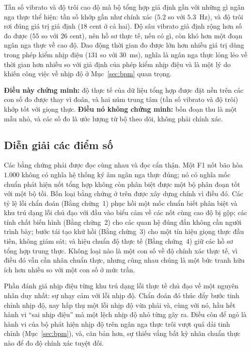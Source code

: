 \documentclass[12pt,a4paper]{article}
\begin{document}
Tần số vibrato và độ trôi cao độ mà bộ tổng hợp giả định gần với những gì ngân nga
thực thể hiện: tần số khớp gần như chính xác ($5.2$ so với $5.3$~Hz), và độ trôi rơi
đúng giá trị giả định ($18$ cent ở cả hai). Độ sâu vibrato giả định rộng hơn số đo
được ($55$ so với $26$ cent), nên hồ sơ thực tế, nếu có gì, còn khó hơn một đoạn
ngân nga thực về cao độ. Dao động thời gian đo được lớn hơn nhiều giá trị dùng trong
phép kiểm nhịp điệu ($131$ so với $30$~ms), nghĩa là ngân nga thực lỏng lẻo về thời
gian hơn nhiều so với giả định của phép kiểm nhịp điệu và là một lý do khiến công
việc về nhịp độ ở Mục~\ref{sec:bpm} quan trọng.

\textbf{Điều này chứng minh:} độ thực tế của dữ liệu tổng hợp được đặt nền trên các
con số đo được thay vì đoán, và hai núm trung tâm (tần số vibrato và độ trôi) khớp
tốt với giọng thực. \textbf{Điều nó không chứng minh:} bốn đoạn thu là một mẫu nhỏ,
và các số đo là ước lượng từ bộ theo dõi, không phải chính xác.

\subsection{Diễn giải các điểm số}
\label{sec:interpret}

Các bằng chứng phải được đọc cùng nhau và đọc cẩn thận. Một F1 nốt bão hòa $1.000$
không có nghĩa hệ thống ký âm ngân nga thực đúng; nó có nghĩa mốc chuẩn phát hiện
nốt tổng hợp không còn phân biệt được một bộ phân đoạn tốt với một bộ tồi. Bốn loại
bằng chứng ở trên được xây dựng chính vì điều đó. Các tỷ lệ lỗi chẩn đoán (Bằng
chứng~1) phục hồi một mốc chuẩn biết phân biệt và khu trú dạng lỗi chủ đạo với đầu
vào biểu cảm về các nốt cùng cao độ bị gộp; các tính chất biến hình (Bằng chứng~2)
cho các quan hệ đúng đắn không cần người trình bày; bước tái tạo khứ hồi (Bằng
chứng~3) cho một tín hiệu giọng thực đầu tiên, không giám sát; và hiệu chuẩn độ thực
tế (Bằng chứng~4) giữ các hồ sơ tổng hợp trung thực. Không loại nào là một con số về
độ chính xác thực tế, vì điều đó vẫn cần nhãn chuẩn thực, nhưng cùng nhau chúng là
một bức tranh hữu ích hơn nhiều so với một con số ở mức trần.

Phần đánh giá nhịp điệu từng khu trú dạng lỗi thực tế chủ đạo về một nguyên nhân duy
nhất: sự nhạy cảm với lỗi nhịp độ. Chẩn đoán đó thúc đẩy bước tinh chỉnh nhịp độ,
nay hấp thụ một lỗi nhịp độ vừa phải và, cùng với nó, hầu hết hành vi ``sai nhịp
điệu'' mà một lệch nhịp độ nhỏ từng gây ra. Điều còn để ngỏ là hành vi của bộ phát
hiện nhịp độ trên ngân nga thực trôi vượt quá dải tinh chỉnh (Mục~\ref{sec:bpm}), và,
căn bản hơn, sự thiếu vắng bất kỳ nhãn chuẩn thực nào để đo độ chính xác tuyệt đối.
\end{document}
